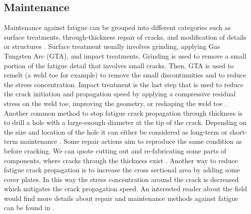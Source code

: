 \subsection{Maintenance}
\noindent
Maintenance against fatigue can be grouped into different categories such as surface treatments, through-thickness repair of cracks, and modification of details or structures \citep{FHWA2013}. Surface
treatment usually involves grinding, applying Gas Tungsten Arc (GTA), and impact treatments. Grinding is used to remove a small portion of the fatigue detail that involves small cracks. Then, GTA is
used to remelt (a weld toe for example) to remove the small discontinuities and to reduce the stress concentration. Impact treatment is the last step that is used to reduce the crack initiation and
propagation speed by applying a compressive residual stress on the weld toe, improving the geometry, or reshaping the weld toe \citep{Fisher1998}. Another common method to stop fatigue crack
propagation through thickness is to drill a hole with a large-enough diameter at the tip of the crack. Depending on the size and location of the hole it can either be considered as long-term or
short-term maintenance \citep{Connor2017}. Some repair actions aim to reproduce the same condition as before cracking. We can quote cutting out and re-fabricating some parts of components, where cracks 
through the thickness exist \citep{Fisher1998}. Another way to reduce fatigue crack propagation is to increase the cross sectional area by adding some cover plates. In this way the stress concentration 
around the crack is decreased which mitigates the crack propagation speed. An interested reader about the field would find more details about repair and maintenance methods against fatigue can be found in 
\citep{Fisher1998, Connor2017, FHWA2013}. 


